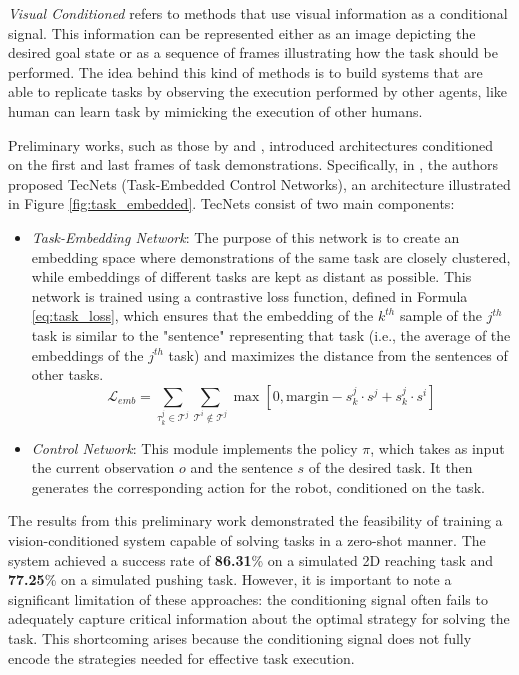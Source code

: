 \textit{Visual Conditioned} refers to methods that use visual information as a conditional signal. This information can be represented either as an image depicting the desired goal state or as a sequence of frames illustrating how the task should be performed. The idea behind this kind of methods is to build systems that are able to replicate tasks by observing the execution performed by other agents, like human can learn task by mimicking the execution of other humans.

Preliminary works, such as those by \cite{james2018task_embedded} and \cite{bhutani2022attentive_one_shot}, introduced architectures conditioned on the first and last frames of task demonstrations. Specifically, in \cite{james2018task_embedded}, the authors proposed TecNets (Task-Embedded Control Networks), an architecture illustrated in Figure \ref{fig:task_embedded}. TecNets consist of two main components:

\begin{itemize}
    \item \textit{Task-Embedding Network}: The purpose of this network is to create an embedding space where demonstrations of the same task are closely clustered, while embeddings of different tasks are kept as distant as possible. This network is trained using a contrastive loss function, defined in Formula \ref{eq:task_loss}, which ensures that the embedding of the $k^{th}$ sample of the $j^{th}$ task is similar to the "sentence" representing that task (i.e., the average of the embeddings of the $j^{th}$ task) and maximizes the distance from the sentences of other tasks.
    \begin{equation}
        \label{eq:task_loss}
        \mathcal{L}_{emb} = \sum_{\tau^{j}_{k} \in \mathcal{T}^{j}}\sum_{ \mathcal{T}^{i} \notin \mathcal{T}^{j}} \max \left[ 0, \text{margin} - s^{j}_{k}\cdot s^j + s^{j}_{k}\cdot s^i \right]
    \end{equation}
    \item \textit{Control Network}: This module implements the policy $\pi$, which takes as input the current observation $o$ and the sentence $s$ of the desired task. It then generates the corresponding action for the robot, conditioned on the task.
\end{itemize}



The results from this preliminary work demonstrated the feasibility of training a vision-conditioned system capable of solving tasks in a zero-shot manner. The system achieved a success rate of \textbf{86.31}\% on a simulated 2D reaching task and \textbf{77.25}\% on a simulated pushing task. However, it is important to note a significant limitation of these approaches: the conditioning signal often fails to adequately capture critical information about the optimal strategy for solving the task. This shortcoming arises because the conditioning signal does not fully encode the strategies needed for effective task execution.


